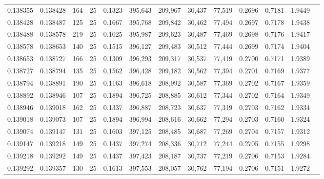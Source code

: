 \begin{tabular}{rrrrrrrrrrrrr}
0.138355 & 0.138428 &   164 &  25 &                                     0.1323 & 395,643 & 209,967 &  30,437 &  77,519 & 0.2696 & 0.7181 & 1.9449 \\
0.138428 & 0.138487 &   125 &  25 &                                     0.1667 & 395,768 & 209,842 &  30,462 &  77,494 & 0.2697 & 0.7178 & 1.9438 \\
0.138488 & 0.138578 &   219 &  25 &                                     0.1025 & 395,987 & 209,623 &  30,487 &  77,469 & 0.2698 & 0.7176 & 1.9417 \\
0.138578 & 0.138653 &   140 &  25 &                                     0.1515 & 396,127 & 209,483 &  30,512 &  77,444 & 0.2699 & 0.7174 & 1.9404 \\
0.138653 & 0.138727 &   166 &  25 &                                     0.1309 & 396,293 & 209,317 &  30,537 &  77,419 & 0.2700 & 0.7171 & 1.9389 \\
0.138727 & 0.138794 &   135 &  25 &                                     0.1562 & 396,428 & 209,182 &  30,562 &  77,394 & 0.2701 & 0.7169 & 1.9377 \\
0.138794 & 0.138891 &   190 &  25 &                                     0.1163 & 396,618 & 208,992 &  30,587 &  77,369 & 0.2702 & 0.7167 & 1.9359 \\
0.138892 & 0.138946 &   107 &  25 &                                     0.1894 & 396,725 & 208,885 &  30,612 &  77,344 & 0.2702 & 0.7164 & 1.9349 \\
0.138946 & 0.139018 &   162 &  25 &                                     0.1337 & 396,887 & 208,723 &  30,637 &  77,319 & 0.2703 & 0.7162 & 1.9334 \\
0.139018 & 0.139073 &   107 &  25 &                                     0.1894 & 396,994 & 208,616 &  30,662 &  77,294 & 0.2703 & 0.7160 & 1.9324 \\
0.139074 & 0.139147 &   131 &  25 &                                     0.1603 & 397,125 & 208,485 &  30,687 &  77,269 & 0.2704 & 0.7157 & 1.9312 \\
0.139147 & 0.139218 &   149 &  25 &                                     0.1437 & 397,274 & 208,336 &  30,712 &  77,244 & 0.2705 & 0.7155 & 1.9298 \\
0.139218 & 0.139292 &   149 &  25 &                                     0.1437 & 397,423 & 208,187 &  30,737 &  77,219 & 0.2706 & 0.7153 & 1.9284 \\
0.139292 & 0.139357 &   130 &  25 &                                     0.1613 & 397,553 & 208,057 &  30,762 &  77,194 & 0.2706 & 0.7151 & 1.9272 \\

\end{tabular}
